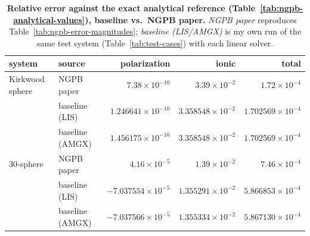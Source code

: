 \begin{table}[!htb]
\centering
\footnotesize
\caption[Baseline vs.\ NGPB analytical accuracy]{\textbf{Relative error against the exact analytical reference (Table~\ref{tab:ngpb-analytical-values}), baseline vs.\ NGPB paper.} \emph{NGPB paper} reproduces Table~\ref{tab:ngpb-error-magnitudes}; \emph{baseline (LIS/AMGX)} is my own run of the same test system (Table~\ref{tab:test-cases}) with each linear solver.}
\label{tab:baseline-accuracy}
\begin{tabular}{llrrr}
\toprule
system & source & polarization & ionic & total \\
\midrule
Kirkwood sphere & NGPB paper & $7.38\times10^{-10}$ & $3.39\times10^{-2}$ & $1.72\times10^{-4}$ \\
 & baseline (LIS) & $1.246641\times10^{-10}$ & $3.358548\times10^{-2}$ & $1.702569\times10^{-4}$ \\
 & baseline (AMGX) & $1.456175\times10^{-10}$ & $3.358548\times10^{-2}$ & $1.702569\times10^{-4}$ \\
\midrule
30-sphere & NGPB paper & $4.16\times10^{-5}$ & $1.39\times10^{-2}$ & $7.46\times10^{-4}$ \\
 & baseline (LIS) & $-7.037554\times10^{-5}$ & $1.355291\times10^{-2}$ & $5.866853\times10^{-4}$ \\
 & baseline (AMGX) & $-7.037566\times10^{-5}$ & $1.355334\times10^{-2}$ & $5.867130\times10^{-4}$ \\
\bottomrule
\end{tabular}
\end{table}
